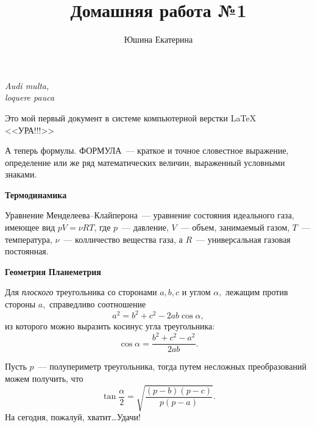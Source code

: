 \documentclass[12pt]{article}
\title{Домашняя работа №1}
\author{Юшина Екатерина}
\date{}
\renewcommand{\tg}{\tan}
\begin{document}
	\maketitle
	\begin{flushright}
	    \textit{Audi multa, \\loquere pauca}
	\end{flushright}
	\vspace{20pt}
	\begin{center}
	    Это мой первый документ в системе компьютерной верстки \LaTeX \\
	    \Huge {<<УРА!!!>>}
	\end{center} \par
	А теперь формулы. ФОРМУЛА~--- краткое и точное словестное выражение, определение или же ряд математических величин, выраженный условными знаками. 
	
	\vspace{15pt} 
	\hspace{28pt} \LARGE\textbf{Термодинамика} \par
	\normalsize Уравнение Менделеева--Клайперона~--- уравнение состояния идеального газа, имеющее вид $ pV = \nu RT $, где $p$~--- давление, $V$~--- объем, занимаемый газом, $T$~--- температура, $\nu$~--- колличество вещества газа, а $R$~--- универсальная газовая постоянная.
	
	\vspace{15pt} 
	\hspace{28pt} \LARGE\textbf{Геометрия} \hfill\LARGE\textbf{Планеметрия} \par
	\normalsize Для \textit{плоского} треугольника со сторонами $a, b, c$ и углом $\alpha,$ лежащим против стороны $a,$ справедливо соотношение
	$$
	    a^2 = b^2 + c^2 - 2ab \cos\alpha,
	$$
	из которого можно выразить косинус угла треугольника:
	$$
	    \cos\alpha = \frac{b^2 + c^2 - a^2}{2ab}.
	$$ \par
	Пусть $p$~--- полупериметр треугольника, тогда путем несложных преобразований можем получить, что
	$$
	    \tg\frac{\alpha}{2} = \sqrt{\frac{(p - b)(p - c)}{p(p - a)}}.
	$$
	\vspace{1cm}
	На сегодня, пожалуй, хватит\dots Удачи!
\end{document}
